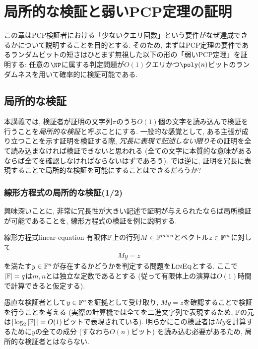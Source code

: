 \chapter{局所的な検証と弱いPCP定理の証明}

この章はPCP検証者における「少ないクエリ回数」という要件がなぜ達成できるかについて説明することを目的とする.
そのため, まずはPCP定理の要件であるランダムビットの短さはひとまず無視した以下の形の「弱いPCP定理」を証明する: 任意の$\NP$に属する判定問題が$O(1)$クエリかつ$\poly(n)$ビットのランダムネスを用いて確率的に検証可能である.

\section{局所的な検証}
本講義では, 検証者が証明の文字列$\pi$のうち$O(1)$個の文字を読み込んで検証を行うことを\emph{局所的な検証}と呼ぶことにする.
一般的な感覚として, ある主張が成り立つことを示す証明を検証する際, \emph{冗長に表現で記述しない限り}その証明を全て読み込まなければ検証できないと思われる (全ての文字に本質的な意味があるならば全てを確認しなければならないはずであろう).
では逆に, 証明を冗長に表現することで局所的な検証を可能にすることはできるだろうか?

\subsection{線形方程式の局所的な検証(1/2)}
興味深いことに, 非常に冗長性が大きい記述で証明が与えられたならば局所検証が可能であることを, 線形方程式の検証を例に説明する.

\begin{definition}{線形方程式}{linear-equation}
有限体$\mathbb{F}$上の行列$M\in\mathbb{F}^{m\times n}$とベクトル$z\in\mathbb{F}^m$に対して
\begin{align*}
  My = z
\end{align*}
を満たす$y\in\mathbb{F}^n$が存在するかどうかを判定する問題を$\textsc{LinEq}$とする.
ここで$\abs{\mathbb{F}}=q$は$m,n$とは独立な定数であるとする (従って有限体上の演算は$O(1)$時間で計算できると仮定する).
\end{definition}

愚直な検証者として$y\in\mathbb{F}^n$を証拠として受け取り, $My=z$を確認することで検証を行うことを考える (実際の計算機では全てを二進文字列で表現するため, $\mathbb{F}$の元は$\lceil\log_2\abs{\mathbb{F}}\rceil=O(1)$ビットで表現されている).
明らかにこの検証者は$My$を計算するために$y$の全ての成分 (すなわち$O(n)$ビット) を読み込む必要があるため, 局所的な検証者とはならない.

